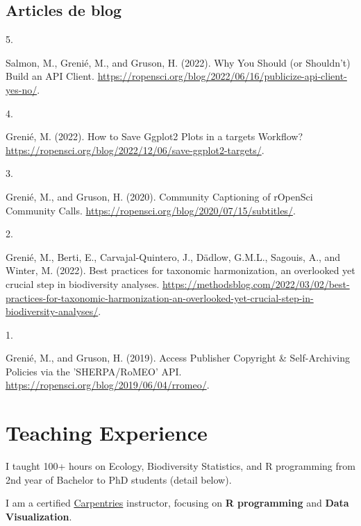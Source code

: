 \documentclass[10pt,a4paper,]{article}
\newlength{\cslhangindent}
\newlength{\csllabelwidth}
\newcommand{\CSLLeftMargin}[1]{\parbox[t]{\csllabelwidth}{\hfill #1~}}
\newcommand{\CSLRightInline}[1]{\parbox[t]{\linewidth - \cslhangindent - \csllabelwidth}{#1}\vspace{0.8ex}}
\begin{document}
\hypertarget{articles-de-blog}{%
\subsection{Articles de blog}\label{articles-de-blog}}

\hypertarget{bibliography}{}
\leavevmode{}%
\CSLLeftMargin{5. }%
\CSLRightInline{Salmon, M., Grenié, M., and Gruson, H. (2022). Why You
Should (or Shouldn't) Build an API Client.
\url{https://ropensci.org/blog/2022/06/16/publicize-api-client-yes-no/}.}

\leavevmode{}%
\CSLLeftMargin{4. }%
\CSLRightInline{Grenié, M. (2022). How to Save Ggplot2 Plots in a
targets Workflow?
\url{https://ropensci.org/blog/2022/12/06/save-ggplot2-targets/}.}

\leavevmode{}%
\CSLLeftMargin{3. }%
\CSLRightInline{Grenié, M., and Gruson, H. (2020). Community Captioning
of rOpenSci Community Calls.
\url{https://ropensci.org/blog/2020/07/15/subtitles/}.}

\leavevmode{}%
\CSLLeftMargin{2. }%
\CSLRightInline{Grenié, M., Berti, E., Carvajal-Quintero, J., Dädlow,
G.M.L., Sagouis, A., and Winter, M. (2022). Best practices for taxonomic
harmonization, an overlooked yet crucial step in biodiversity analyses.
\url{https://methodsblog.com/2022/03/02/best-practices-for-taxonomic-harmonization-an-overlooked-yet-crucial-step-in-biodiversity-analyses/}.}

\leavevmode{}%
\CSLLeftMargin{1. }%
\CSLRightInline{Grenié, M., and Gruson, H. (2019). Access Publisher
Copyright \& Self-Archiving Policies via the 'SHERPA/RoMEO' API.
\url{https://ropensci.org/blog/2019/06/04/rromeo/}.}

\hypertarget{teaching-experience}{%
\section{Teaching Experience}\label{teaching-experience}}

I taught 100+ hours on Ecology, Biodiversity Statistics, and R
programming from 2nd year of Bachelor to PhD students (detail below).

I am a certified \href{https://carpentries.org/}{Carpentries}
instructor, focusing on \textbf{R programming} and \textbf{Data
Visualization}.
\end{document}
